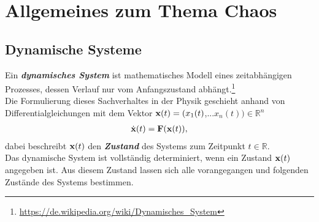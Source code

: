 

\section{Allgemeines zum Thema Chaos}
\label{sec:allgemeines}

\subsection{Dynamische Systeme}
\label{sub:dynamSys}
Ein \textit{\textbf{dynamisches System}} ist mathematisches Modell eines zeitabhängigen Prozesses, dessen Verlauf nur vom Anfangszustand abhängt.\footnote{\url{https://de.wikipedia.org/wiki/Dynamisches_System}}\\
Die Formulierung dieses Sachverhaltes in der Physik geschieht anhand von Differentialgleichungen mit dem Vektor $\boldsymbol{\mathbf{x}}(t)=(x_1(t)$,...$x_n(t))\in\mathbb{R}^n$
\begin{gather}
    \dot{\boldsymbol{\mathbf{x}}}(t)=\boldsymbol{\mathbf{F}}(\boldsymbol{\mathbf{x}}(t)),
    \label{eq:dynamDGL}
\end{gather}
dabei beschreibt $\boldsymbol{\mathbf{x}}(t)$ den \textit{\textbf{Zustand}} des Systems zum Zeitpunkt $t\in\mathbb{R}$.\\
Das dynamische System ist vollständig determiniert, wenn ein Zustand $\boldsymbol{\mathbf{x}}(t)$ angegeben ist. Aus diesem Zustand lassen sich alle vorangegangen und folgenden Zustände des Systems bestimmen.

